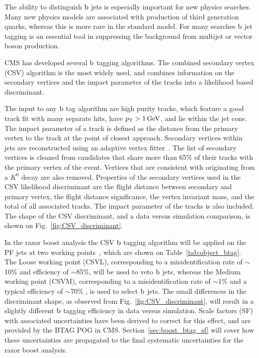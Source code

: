 The ability to distinguish $\mathrm{b}$ jets is especially important for new physics searches. Many new
physics models are associated with production of third generation quarks, whereas this is more rare
in the standard model. For many searches $\mathrm{b}$ jet tagging is an essential tool in suppressing
the background from multijet or vector boson production. 

CMS has developed several $\mathrm{b}$ tagging algorithms\cite{btag7TeV,btag8TeV}. The combined
secondary vertex (CSV) algorithm is the most widely used, and combines information on the secondary
vertices and the impact parameter of the tracks into a likelihood based discriminant. 
 
The input to any $\mathrm{b}$ tag algorithm are high purity tracks, which feature a good track fit with
many separate hits, have $p_{\mathrm{T}} > 1\,\text{Ge\hspace{-.08em}V}$, and lie within the jet cone. 
The impact parameter of a track is defined as the distance from the primary vertex to the track at
the point of closest approach.  
Secondary vertices within jets are reconstructed using an adaptive vertex
fitter~\cite{Fruhwirth:2007hz}. The list of secondary vertices is cleaned from candidates that
share more than 65\% of their tracks with the primary vertex of the event. Vertices that are
consistent with originating from a $K^0$ decay are also removed. Properties of the secondary
vertices used in the CSV likelihood discriminant are the flight distance between secondary and
primary vertex, the flight distance significance, the vertex invariant mass, and the total \pt of
all associated tracks. The impact parameter of the tracks is also included. The shape of the CSV
discriminant, and a data versus simulation comparison, is shown on Fig.~\ref{fig:CSV_discriminant}.

In the razor boost analysis the CSV $\mathrm{b}$ tagging algorithm will be applied on the PF jets at two
working points~\cite{BTagWP}, which are shown on Table~\ref{tab:object_btag}. 
The Loose working point (CSVL), corresponding to a misidentification rate of $\sim$10\% and
efficiency of $\sim$85\%, will be used to veto $\mathrm{b}$ jets, whereas the Medium working point
(CSVM), corresponding to a misidentification rate of $\sim$1\% and a typical efficiency of
$\sim$70\% , is used to select $\mathrm{b}$ jets.
The small differences in the discriminant shape, as observed from Fig.~\ref{fig:CSV_discriminant}, 
will result in a slightly different $\mathrm{b}$ tagging efficiency in data versus simulation. Scale
factors (SF) with associated uncertainties have been derived to correct for this effect, and are
provided by the BTAG POG in CMS. Section~\ref{sec:boost_btag_sf} will cover how these
uncertainties are propagated to the final systematic uncertainties for the razor boost analysis. 

